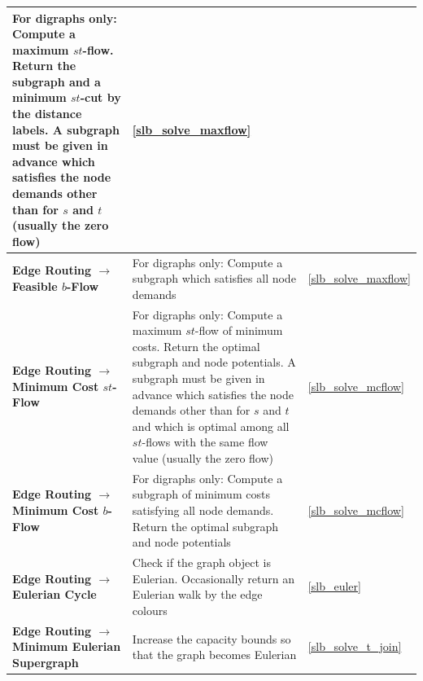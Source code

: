 \documentclass[a4paper,11pt,twoside]{book}
\begin{document}
\begin{tabular}{p{9.3cm}|p{14cm}|p{1.5cm}}
     For digraphs only: Compute a maximum $st$-flow. Return the
     subgraph and a minimum $st$-cut by the distance labels. A subgraph must be
     given in advance which satisfies the node demands other than for $s$ and $t$
     (usually the zero flow) &
     \ref{slb_solve_maxflow} \\ \hline
\bf  Edge Routing $\rightarrow$ Feasible $b$-Flow &
     For digraphs only: Compute a subgraph which satisfies all
     node demands &
     \ref{slb_solve_maxflow} \\ \hline
\bf  Edge Routing $\rightarrow$ Minimum Cost $st$-Flow &
     For digraphs only: Compute a maximum $st$-flow of minimum
     costs. Return the optimal subgraph and node potentials. A subgraph must be
     given in advance which satisfies the node demands other than for $s$ and $t$
     and which is optimal among all $st$-flows with the same flow value (usually
     the zero flow) &
     \ref{slb_solve_mcflow} \\ \hline
\bf  Edge Routing $\rightarrow$ Minimum Cost $b$-Flow &
     For digraphs only: Compute a subgraph of minimum costs
     satisfying all node demands. Return the optimal subgraph and node potentials &
     \ref{slb_solve_mcflow} \\ \hline
\bf  Edge Routing $\rightarrow$ Eulerian Cycle &
     Check if the graph object is Eulerian. Occasionally return an Eulerian walk
     by the edge colours &
     \ref{slb_euler} \\ \hline
\bf  Edge Routing $\rightarrow$ Minimum Eulerian Supergraph &
     Increase the capacity bounds so that the graph becomes Eulerian &
     \ref{slb_solve_t_join}
\end{tabular}
\end{document}
